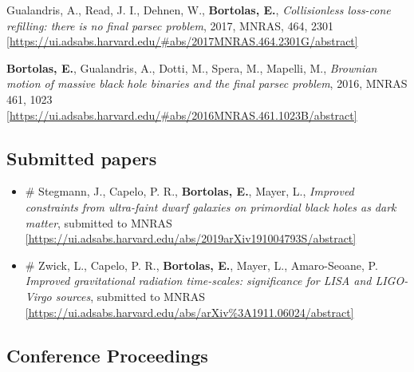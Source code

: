 \documentclass[11pt,a4paper]{article}
\begin{document}
\begin{etaremune}
\item Gualandris, A., Read, J. I., Dehnen, W., {\bf Bortolas, E.}, {\it Collisionless loss-cone refilling: there is no final parsec problem}, 2017, MNRAS, 464, 2301 
\\ \href{https://ui.adsabs.harvard.edu/#abs/2017MNRAS.464.2301G/abstract}{\scriptsize [https://ui.adsabs.harvard.edu/\#abs/2017MNRAS.464.2301G/abstract]}


\item {\bf Bortolas, E.}, Gualandris, A., Dotti, M., Spera, M., Mapelli, M., {\it Brownian motion of massive black hole binaries and the final parsec problem}, 2016, MNRAS 461, 1023 \\ \href{https://ui.adsabs.harvard.edu/#abs/2016MNRAS.461.1023B/abstract}{\scriptsize [https://ui.adsabs.harvard.edu/\#abs/2016MNRAS.461.1023B/abstract]}


\end{etaremune}

\subsection*{ Submitted papers }

\begin{itemize}
\setlength\itemsep{-1pt}
\item  \# Stegmann, J., Capelo, P. R.,  {\bf Bortolas, E.}, Mayer, L., { \it Improved constraints from ultra-faint dwarf galaxies on primordial black holes as dark matter}, submitted to MNRAS \\ \href{https://ui.adsabs.harvard.edu/abs/2019arXiv191004793S/abstract}{\scriptsize [https://ui.adsabs.harvard.edu/abs/2019arXiv191004793S/abstract]}

\item  \# Zwick, L., Capelo, P. R., \textbf{Bortolas, E.}, Mayer, L., Amaro-Seoane, P. { \it Improved gravitational radiation time-scales: significance for LISA and LIGO-Virgo sources}, submitted to MNRAS \\ \href{https://ui.adsabs.harvard.edu/abs/arXiv\%3A1911.06024/abstract}{\scriptsize [https://ui.adsabs.harvard.edu/abs/arXiv\%3A1911.06024/abstract]}
\end{itemize}


\subsection*{Conference Proceedings }
\end{document}
